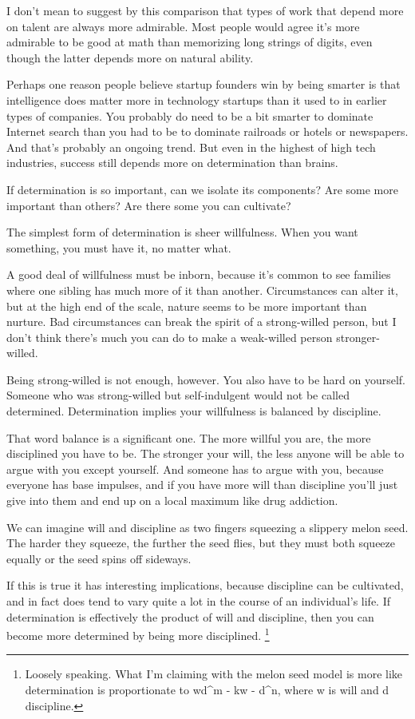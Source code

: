 \documentclass[12pt]{book}
\begin{document}
I don't mean to suggest by this comparison that types of work that
depend more on talent are always more admirable. Most people would agree
it's more admirable to be good at math than memorizing long strings of
digits, even though the latter depends more on natural ability.

Perhaps one reason people believe startup founders win by being smarter
is that intelligence does matter more in technology startups than it
used to in earlier types of companies. You probably do need to be a bit
smarter to dominate Internet search than you had to be to dominate
railroads or hotels or newspapers. And that's probably an ongoing trend.
But even in the highest of high tech industries, success still depends
more on determination than brains.

If determination is so important, can we isolate its components? Are
some more important than others? Are there some you can cultivate?

The simplest form of determination is sheer willfulness. When you want
something, you must have it, no matter what.

A good deal of willfulness must be inborn, because it's common to see
families where one sibling has much more of it than another.
Circumstances can alter it, but at the high end of the scale, nature
seems to be more important than nurture. Bad circumstances can break the
spirit of a strong-willed person, but I don't think there's much you can
do to make a weak-willed person stronger-willed.

Being strong-willed is not enough, however. You also have to be hard on
yourself. Someone who was strong-willed but self-indulgent would not be
called determined. Determination implies your willfulness is balanced by
discipline.

That word balance is a significant one. The more willful you are, the
more disciplined you have to be. The stronger your will, the less anyone
will be able to argue with you except yourself. And someone has to argue
with you, because everyone has base impulses, and if you have more will
than discipline you'll just give into them and end up on a local maximum
like drug addiction.

We can imagine will and discipline as two fingers squeezing a slippery
melon seed. The harder they squeeze, the further the seed flies, but
they must both squeeze equally or the seed spins off sideways.

If this is true it has interesting implications, because discipline can
be cultivated, and in fact does tend to vary quite a lot in the course
of an individual's life. If determination is effectively the product of
will and discipline, then you can become more determined by being more
disciplined. \footnote{Loosely speaking. What I'm claiming with the melon seed model is
more like determination is proportionate to wd\^{}m - k\textbar w -
d\textbar\^{}n, where w is will and d discipline.}
\end{document}
